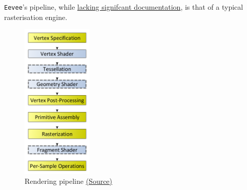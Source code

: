 \documentclass[11pt]{article}
\begin{document}
\texttt{Eevee}'s pipeline, while \href{https://wiki.blender.org/wiki/Source/Render/EEVEE/GPUPipeline}{lacking signifcant documentation}, is that of a typical
rasterisation engine.
\begin{figure}[htbp]
\centering
\includegraphics[width=0.3\textwidth]{Images/RenderingPipeline.png}
\caption{\label{rendering-pipline-eevee}Rendering pipeline \href{https://www.khronos.org/opengl/wiki/File:RenderingPipeline.png}{(Source)}}
\end{figure}
\end{document}

